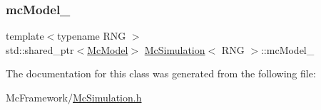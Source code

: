 \hypertarget{class_mc_simulation_a5ccf1b2ffc6ec2dd7d7efcf4c6163f62}{}\label{class_mc_simulation_a5ccf1b2ffc6ec2dd7d7efcf4c6163f62} 
\subsubsection{\texorpdfstring{mc\+Model\+\_\+}{mcModel\_}}
{\footnotesize\ttfamily template$<$typename R\+NG $>$ \\
std\+::shared\+\_\+ptr$<$\hyperlink{class_mc_model}{Mc\+Model}$>$ \hyperlink{class_mc_simulation}{Mc\+Simulation}$<$ R\+NG $>$\+::mc\+Model\+\_\+\hspace{0.3cm}{\ttfamily [private]}}



The documentation for this class was generated from the following file\+:\begin{DoxyCompactItemize}
\item 
Mc\+Framework/\hyperlink{_mc_simulation_8h}{Mc\+Simulation.\+h}\end{DoxyCompactItemize}
